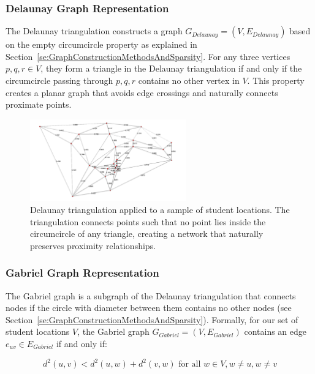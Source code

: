 \subsubsection{Delaunay Graph Representation}
\label{subsubsec:delaunay}

The Delaunay triangulation constructs a graph $G_{Delaunay}=(V, E_{Delaunay})$ based on the empty circumcircle property as explained in Section~\ref{se:GraphConstructionMethodsAndSparsity}. For any three vertices $p, q, r \in V$, they form a triangle in the Delaunay triangulation if and only if the circumcircle passing through $p, q, r$ contains no other vertex in $V$. This property creates a planar graph that avoids edge crossings and naturally connects proximate points.

\begin{figure}[!htbp]
\centering
\includegraphics[width=0.6\textwidth]{img/delaunay}
\caption{Delaunay triangulation applied to a sample of student locations. The triangulation connects points such that no point lies inside the circumcircle of any triangle, creating a network that naturally preserves proximity relationships.}
\label{fig:delaunay_graph}
\end{figure}

\subsubsection{Gabriel Graph Representation}
\label{subsubsec:gabriel}

The Gabriel graph is a subgraph of the Delaunay triangulation that connects nodes if the circle with diameter between them contains no other nodes (see Section~\ref{se:GraphConstructionMethodsAndSparsity}). Formally, for our set of student locations $V$, the Gabriel graph $G_{Gabriel}=(V, E_{Gabriel})$ contains an edge $e_{uv} \in E_{Gabriel}$ if and only if:

\begin{equation}
d^2(u, v) < d^2(u, w) + d^2(v, w) \text{ for all } w \in V, w \neq u, w \neq v
\end{equation}

